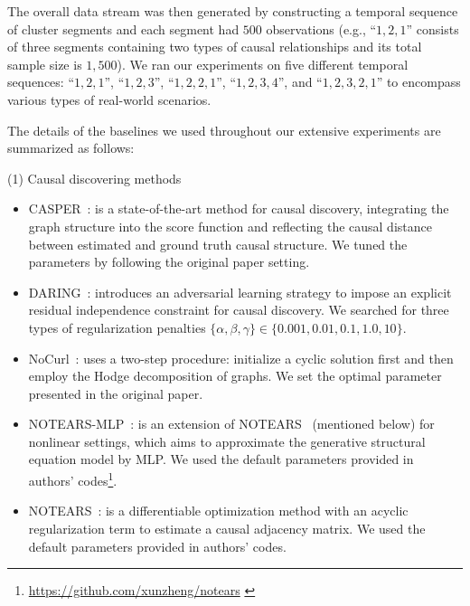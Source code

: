 The overall data stream was then generated by constructing a temporal sequence of cluster segments and each segment had $500$ observations (e.g., ``$1,2,1$'' consists of three segments containing two types of causal relationships and its total sample size is $1,500$). We ran our experiments on five different temporal sequences: ``$1,2,1$'', ``$1,2,3$'', ``$1,2,2,1$'', ``$1,2,3,4$'', and ``$1,2,3,2,1$'' to encompass various types of real-world scenarios.
\par
{}
The details of the baselines we used throughout our extensive experiments are summarized as follows:
\par\noindent
(1) Causal discovering methods
{\setlength{\leftmargini}{11pt}
\vspace{-0.3ex}
\begin{itemize}
    \item CASPER~\cite{liu2023discovering}: is a state-of-the-art method for causal discovery, integrating the graph structure into the score function and reflecting the causal distance between estimated and ground truth causal structure. We tuned the parameters by following the original paper setting.
    \item DARING~\cite{he2021daring}: introduces an adversarial learning strategy to impose an explicit residual independence constraint for causal discovery. We searched for three types of regularization penalties $\{\alpha, \beta, \gamma\}\in\{0.001, 0.01, 0.1, 1.0, 10\}$.
    \item NoCurl~\cite{yu2021dag}: uses a two-step procedure: initialize a cyclic solution first and then employ the Hodge decomposition of graphs. We set the optimal parameter presented in the original paper.
    \item NOTEARS-MLP~\cite{zheng2020learning}: is an extension of NOTEARS~\cite{zheng2018dags} (mentioned below) for nonlinear settings, which aims to approximate the generative structural equation model by MLP.
    We used the default parameters provided in authors' codes\footnote[2]{\url{https://github.com/xunzheng/notears} \label{fot:notears}}.
    \item NOTEARS~\cite{zheng2018dags}:
    is a differentiable optimization method with an acyclic regularization term to estimate a causal adjacency matrix.
    We used the default parameters provided in authors' codes.

\end{itemize}}
